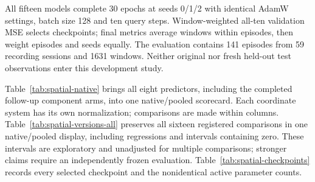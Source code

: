 All fifteen models complete 30 epochs at seeds 0/1/2 with identical AdamW
settings, batch size 128 and ten query steps. Window-weighted all-ten
validation MSE selects checkpoints; final metrics average windows within
episodes, then weight episodes and seeds equally. The evaluation contains 141 episodes from 59 recording sessions and 1631 windows. Neither original nor fresh
held-out test observations enter this development study.

Table~\ref{tab:spatial-native} brings all eight predictors, including the
completed follow-up component arms, into one native/pooled scorecard.
Each coordinate system has its own
normalization; comparisons are made within columns. Table~\ref{tab:spatial-versions-all}
preserves all sixteen registered comparisons in one native/pooled display,
including regressions and intervals containing zero. These intervals are
exploratory and unadjusted for multiple comparisons; stronger claims require
an independently frozen evaluation. Table~\ref{tab:spatial-checkpoints}
records every selected checkpoint and the nonidentical active parameter counts.


